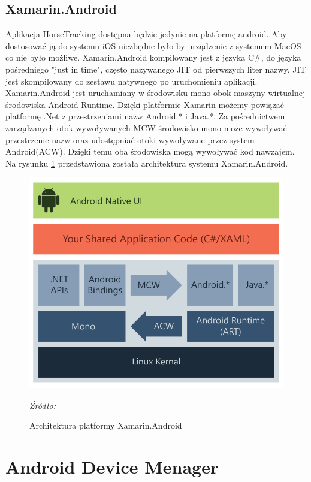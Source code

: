 \documentclass[12pt,oneside]{report}
\begin{document}
\subsection{Xamarin.Android}
Aplikacja HorseTracking dostępna będzie jedynie na platformę android. Aby dostosować ją do systemu iOS niezbędne było by urządzenie z systemem MacOS co nie było możliwe.
Xamarin.Android kompilowany jest z języka C\#, do języka pośredniego "just in time", często nazywanego JIT od pierwszych liter nazwy. JIT jest skompilowany do zestawu natywnego po uruchomieniu aplikacji. Xamarin.Android jest uruchamiany w środowisku mono obok maszyny wirtualnej środowiska Android Runtime. Dzięki platformie Xamarin możemy powiązać platformę .Net z przestrzeniami nazw Android.* i Java.*. Za pośrednictwem zarządzanych otok wywoływanych MCW środowisko mono może wywoływać przestrzenie nazw oraz udostępniać otoki wywoływane przez system Android(ACW). Dzięki temu oba środowiska mogą wywoływać kod nawzajem. Na rysunku \ref{AndroidArchitecture} przedstawiona została architektura systemu Xamarin.Android\cite{XamarinLearn}.
\begin{figure}[H]
	\centering
	\includegraphics[scale=0.3]{androidArchitecture}
	\caption{Architektura platformy Xamarin.Android}
	\textit{Źródło: \cite{XamarinLearn}}
	\label{AndroidArchitecture}
\end{figure}

\section{Android Device Menager}
\end{document}
